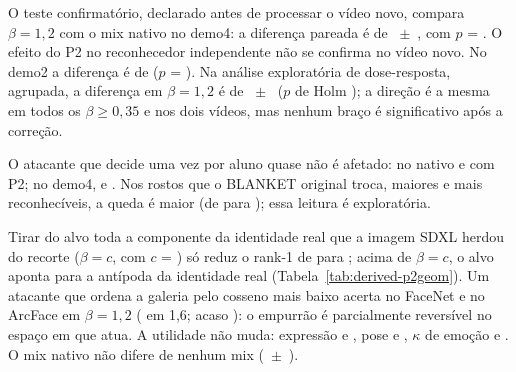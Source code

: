 O teste confirmatório, declarado antes de processar o vídeo novo, compara $\beta = 1{,}2$ com o mix nativo no demo4: a diferença pareada é de ~$\pm$~, com $p$ = . O efeito do P2 no reconhecedor independente não se confirma no vídeo novo. No demo2 a diferença é de  ($p$ = ). Na análise exploratória de dose-resposta, agrupada, a diferença em $\beta = 1{,}2$ é de ~$\pm$~ ($p$ de Holm ); a direção é a mesma em todos os $\beta \ge 0{,}35$ e nos dois vídeos, mas nenhum braço é significativo após a correção.

O atacante que decide uma vez por aluno quase não é afetado:  no nativo e  com P2; no demo4,  e . Nos rostos que o BLANKET original troca, maiores e mais reconhecíveis, a queda é maior (de  para ); essa leitura é exploratória.

Tirar do alvo toda a componente da identidade real que a imagem SDXL herdou do recorte ($\beta = c$, com $c$ = ) só reduz o rank-1 de  para ; acima de $\beta = c$, o alvo aponta para a antípoda da identidade real (Tabela~\ref{tab:derived-p2geom}). Um atacante que ordena a galeria pelo cosseno mais baixo acerta  no FaceNet e  no ArcFace em $\beta = 1{,}2$ ( em 1,6; acaso ): o empurrão é parcialmente reversível no espaço em que atua. A utilidade não muda: expressão  e , pose \textdegree{} e \textdegree, $\kappa$ de emoção  e . O mix nativo não difere de nenhum mix (~$\pm$~).

